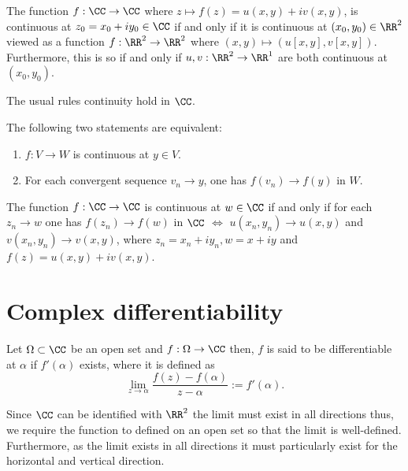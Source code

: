 \documentclass[12pt, a4paper]{article}
\begin{document}
\begin{mdprop}
    The function \(f: \CC \to \CC\) where \(z \mapsto f(z)=u(x,y)+iv(x,y)\), is continuous at \(z_0 = x_0+iy_0 \in \CC\) if and only if it is continuous at \((x_0,y_0) \in \RR^2\) viewed as a function \(f: \RR^2 \to \RR^2\) where \((x,y) \mapsto (u[x,y],v[x,y])\). Furthermore, this is so if and only if \(u,v: \RR^2 \to \RR^1\) are both continuous at \((x_0,y_0)\).
\end{mdprop}

\begin{proposition}
    The usual rules continuity hold in \(\CC\).
\end{proposition}

\begin{proposition}
    The following two statements are equivalent:
    \begin{enumerate}
        \item \(f:V \to W\) is continuous at \(y \in V\).
        \item For each convergent sequence \(v_n \to y\), one has \(f(v_n) \to f(y)\) in \(W\).
    \end{enumerate}
\end{proposition}

\begin{corollary}
    The function \(f : \CC \to \CC\) is continuous at \(w \in \CC\) if and only if for each \(z_n \to w\) one has \(f(z_n)\to f(w)\) in \(\CC\) \(\iff\) \(u(x_n,y_n) \to u(x,y)\) and \(v(x_n,y_n) \to v(x,y)\), where \(z_n = x_n+iy_n, w=x+iy\) and \(f(z)=u(x,y)+iv(x,y)\).
\end{corollary}

\section{Complex differentiability}
\label{sec:C-diff}

\begin{definition}
    Let \(\Omega \subset \CC\) be an open set and \(f : \Omega \to \CC\) then, \(f\) is said to be differentiable at \(\alpha\) if \(f'(\alpha)\) exists, where it is defined as 
    \[\lim_{z \to \alpha} \frac{f(z)-f(\alpha)}{z-\alpha} := f'(\alpha).\]
\end{definition}

\begin{mdremark}
    Since \(\CC\) can be identified with \(\RR^2\) the limit must exist in all directions thus, we require the function to defined on an open set so that the limit is well-defined. Furthermore, as the limit exists in all directions it must particularly exist for the horizontal and vertical direction.
\end{mdremark}
\end{document}
